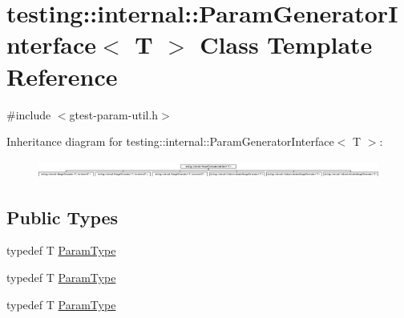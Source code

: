 \hypertarget{classtesting_1_1internal_1_1_param_generator_interface}{}\section{testing\+::internal\+::Param\+Generator\+Interface$<$ T $>$ Class Template Reference}
\label{classtesting_1_1internal_1_1_param_generator_interface}


{\ttfamily \#include $<$gtest-\/param-\/util.\+h$>$}

Inheritance diagram for testing\+::internal\+::Param\+Generator\+Interface$<$ T $>$\+:\begin{figure}[H]
\begin{center}
\leavevmode
\includegraphics[height=0.577915cm]{dd/d30/classtesting_1_1internal_1_1_param_generator_interface}
\end{center}
\end{figure}
\subsection*{Public Types}
\begin{DoxyCompactItemize}
\item 
typedef T \mbox{\hyperlink{classtesting_1_1internal_1_1_param_generator_interface_ab33d2ea424c50beaf503cb125b3cd003}{Param\+Type}}
\item 
typedef T \mbox{\hyperlink{classtesting_1_1internal_1_1_param_generator_interface_ab33d2ea424c50beaf503cb125b3cd003}{Param\+Type}}
\item 
typedef T \mbox{\hyperlink{classtesting_1_1internal_1_1_param_generator_interface_ab33d2ea424c50beaf503cb125b3cd003}{Param\+Type}}
\end{DoxyCompactItemize}
